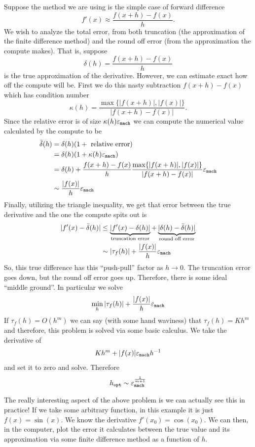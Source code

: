 \documentclass[11pt]{article}
\begin{document}
\begin{example}
    Suppose the method we are using is the simple case of forward difference $$f'(x) \approx \frac{f(x+h)-f(x)}{h}.$$ We wish to analyze the total error, from both truncation (the approximation of the finite difference method) and the round off error (from the approximation the compute makes). That is, suppose $$\delta(h) = \frac{f(x+h)-f(x)}{h}$$ is the true approximation of the derivative. However, we can estimate exact how off the compute will be. First we do this nasty subtraction $f(x+h)-f(x)$ which has condition number $$\kappa(h) = \frac{\max\{|f(x+h)|, |f(x)|\}}{|f(x+h)-f(x)|}.$$
    Since the relative error is of size $\kappa(h) \varepsilon_{\mathtt{mach}}$ we can compute the numerical value calculated by the compute to be \begin{align*}
        \bar{\delta}(h) &= \delta(h) (1+\text{ relative error})\\
        &=\delta(h) (1+\kappa(h)\varepsilon_{\mathtt{mach}})\\
        &= \delta(h) + \frac{f(x+h)-f(x)}{h}\frac{\max\{|f(x+h)|, |f(x)|\}}{|f(x+h)-f(x)|}\varepsilon_{\mathtt{mach}}\\
        &\sim \frac{|f(x)|}{h}\varepsilon_\mathtt{mach}
    \end{align*}
    Finally, utilizing the triangle inequality, we get that error between the true derivative and the one the compute spits out is \begin{align*}|f'(x)-\bar{\delta}(h)| &\leq \underbrace{|f'(x)-\delta(h)|}_{\text{truncation error}}+\underbrace{|\delta(h)-\bar{\delta}(h)|}_{\text{round off error}}\\
    &\sim |\tau_f(h)| + \frac{|f(x)|}{h}\varepsilon_{\mathtt{mach}}\end{align*}
    So, this true difference has this ``push-pull'' factor as $h \to 0$. The truncation error goes down, but the round off error goes up. Therefore, there is some ideal ``middle ground''. In particular we solve $$\min_h |\tau_f(h)| + \frac{|f(x)|}{h}\varepsilon_{\mathtt{mach}}$$
    If $\tau_f(h) = O(h^m)$ we can say (with some hand waviness) that $\tau_f(h) = Kh^m$ and therefore, this problem is solved via some basic calculus. We take the derivative of $$Kh^m + |f(x)|\varepsilon_\mathtt{mach}h^{-1}$$ and set it to zero and solve. Therefore $$h_{\mathtt{opt}} \sim \varepsilon_{\mathtt{mach}}^{\frac{1}{m+1}}$$
\end{example}

The really interesting aspect of the above problem is we can actually see this in practice! If we take some arbitrary function, in this example it is just $f(x) = \sin(x)$. We know the derivative $f'(x_0) = \cos(x_0)$. We can then, in the computer, plot the error it calculates between the true value and its approximation via some finite difference method as a function of $h$.
\end{document}
